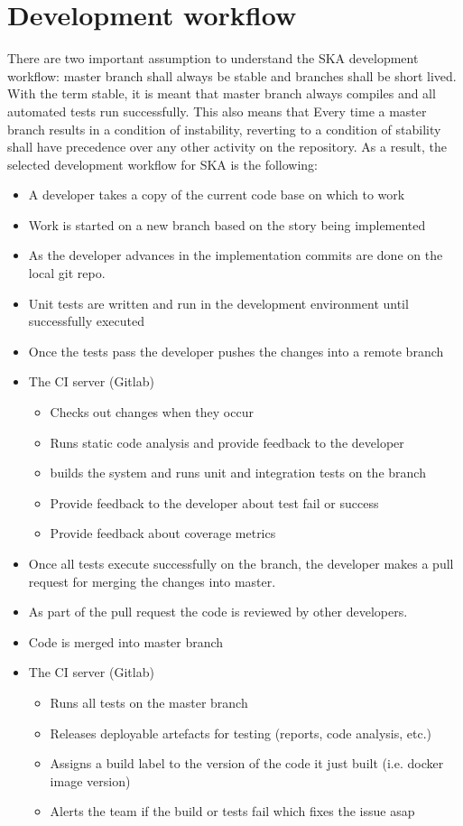 \documentclass[a4paper]{spie}  %
\begin{document}
\section{Development workflow}
There are two important assumption to understand the SKA development workflow: master branch shall always be stable and branches shall be short lived. With the term stable, it is meant that master branch always compiles and all automated tests run successfully. This also means that Every time a master branch results in a condition of instability, reverting to a condition of stability shall have
precedence over any other activity on the repository.
As a result, the selected development workflow for SKA is the following: 
\begin{itemize}
    \item A developer takes a copy of the current code base on which to work
    \item Work is started on a new branch based on the story being implemented
    \item As the developer advances in the implementation commits are done on the local git repo.
    \item Unit tests are written and run in the development environment until successfully executed
    \item Once the tests pass the developer pushes the changes into a remote branch
    \item The CI server (Gitlab)
    \begin{itemize}
        \item Checks out changes when they occur
        \item Runs static code analysis and provide feedback to the developer
        \item builds the system and runs unit and integration tests on the branch
        \item Provide feedback to the developer about test fail or success
        \item Provide feedback about coverage metrics
    \end{itemize}
    \item Once all tests execute successfully on the branch, the developer makes a pull request for merging the changes into master.
    \item As part of the pull request the code is reviewed by other developers.
    \item Code is merged into master branch
    \item The CI server (Gitlab)
    \begin{itemize}
        \item Runs all tests on the master branch
        \item Releases deployable artefacts for testing (reports, code analysis, etc.)
        \item Assigns a build label to the version of the code it just built (i.e. docker image version)
        \item Alerts the team if the build or tests fail which fixes the issue asap
    \end{itemize}
\end{itemize}
\end{document}
